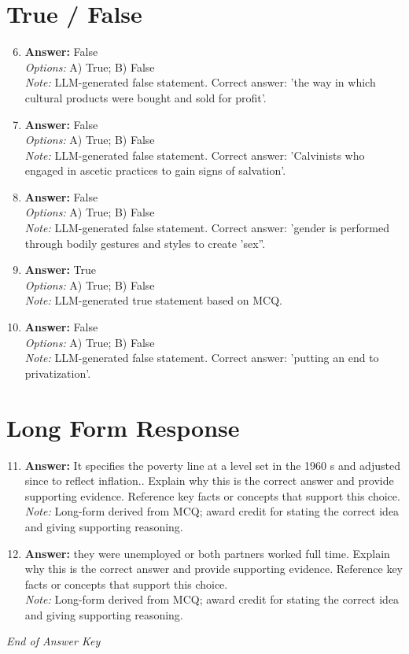 \documentclass[12pt]{article}
\begin{document}
\section*{True / False}
\begin{enumerate}[label=\arabic*.]
\setcounter{enumi}{5}
\item \textbf{Answer:} False
\\ \textit{Options:} A) True; B) False
\\ \textit{Note:} LLM-generated false statement. Correct answer: 'the way in which cultural products were bought and sold for profit'.
\item \textbf{Answer:} False
\\ \textit{Options:} A) True; B) False
\\ \textit{Note:} LLM-generated false statement. Correct answer: 'Calvinists who engaged in ascetic practices to gain signs of salvation'.
\item \textbf{Answer:} False
\\ \textit{Options:} A) True; B) False
\\ \textit{Note:} LLM-generated false statement. Correct answer: 'gender is performed through bodily gestures and styles to create 'sex''.
\item \textbf{Answer:} True
\\ \textit{Options:} A) True; B) False
\\ \textit{Note:} LLM-generated true statement based on MCQ.
\item \textbf{Answer:} False
\\ \textit{Options:} A) True; B) False
\\ \textit{Note:} LLM-generated false statement. Correct answer: 'putting an end to privatization'.
\end{enumerate}

\section*{Long Form Response}
\begin{enumerate}[label=\arabic*.]
\setcounter{enumi}{10}
\item \textbf{Answer:} It specifies the poverty line at a level set in the 1960 s and adjusted since to reflect inflation.. Explain why this is the correct answer and provide supporting evidence. Reference key facts or concepts that support this choice.
\\ \textit{Note:} Long-form derived from MCQ; award credit for stating the correct idea and giving supporting reasoning.
\item \textbf{Answer:} they were unemployed or both partners worked full time. Explain why this is the correct answer and provide supporting evidence. Reference key facts or concepts that support this choice.
\\ \textit{Note:} Long-form derived from MCQ; award credit for stating the correct idea and giving supporting reasoning.
\end{enumerate}

\vfill
\noindent\textit{End of Answer Key}
\end{document}
